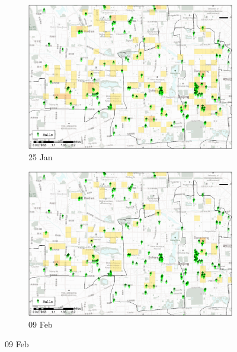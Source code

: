\documentclass[preprints,ijgi,submit,moreauthors]{Definitions/mdpi}
\begin{document}
\begin{figure}[ht]
    \centering
    \begin{subfigure}{.334\textwidth}
        \includegraphics[width=\textwidth]{Figures/Relation_with_POIs/POI_mallsD2020_01_25.eps}
        \caption{25 Jan}
    \end{subfigure}
    \begin{subfigure}{.334\textwidth}
        \includegraphics[width=\textwidth]{Figures/Relation_with_POIs/POI_mallsD2020_02_09.eps}
        \caption{09 Feb}
    \end{subfigure}


\end{figure}
\end{document}
